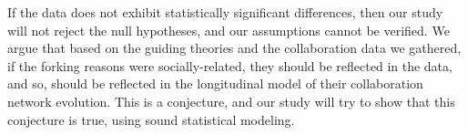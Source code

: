 \documentclass[12pt,letterpaper]{gthesis2}  %
\begin{document}
%
%
%
%

If the data does not exhibit statistically significant differences, then our study will not reject the null hypotheses, and our assumptions cannot be verified. We argue that based on the guiding theories and the collaboration data we gathered, if the forking reasons were socially-related, they should be reflected in the data, and so, should be reflected in the longitudinal model of their collaboration network evolution. This is a conjecture, and our study will try to show that this conjecture is true, using sound statistical modeling.
\end{document}
